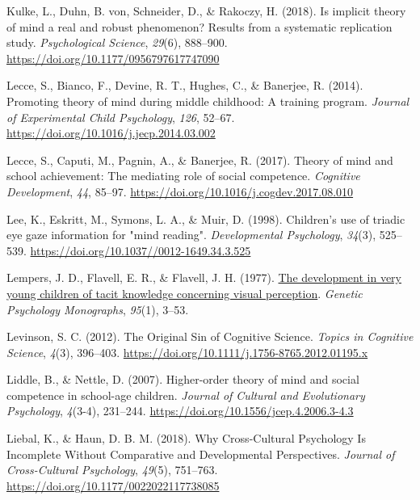\documentclass[
]{scrbook}
\newlength{\cslhangindent}
\newenvironment{CSLReferences}[2] %
 {\begin{list}{}{%
  \setlength{\itemindent}{0pt}
  \setlength{\leftmargin}{0pt}
  \setlength{\parsep}{0pt}
  \ifodd #1
   \setlength{\leftmargin}{\cslhangindent}
   \setlength{\itemindent}{-1\cslhangindent}
  \fi
  \setlength{\itemsep}{#2\baselineskip}}}
 {\end{list}}
\begin{document}
\begin{CSLReferences}{1}{0}
Kulke, L., Duhn, B. von, Schneider, D., \& Rakoczy, H. (2018). Is implicit theory of mind a real and robust phenomenon? {Results} from a systematic replication study. \emph{Psychological Science}, \emph{29}(6), 888--900. \url{https://doi.org/10.1177/0956797617747090}

Lecce, S., Bianco, F., Devine, R. T., Hughes, C., \& Banerjee, R. (2014). Promoting theory of mind during middle childhood: {A} training program. \emph{Journal of Experimental Child Psychology}, \emph{126}, 52--67. \url{https://doi.org/10.1016/j.jecp.2014.03.002}

Lecce, S., Caputi, M., Pagnin, A., \& Banerjee, R. (2017). Theory of mind and school achievement: {The} mediating role of social competence. \emph{Cognitive Development}, \emph{44}, 85--97. \url{https://doi.org/10.1016/j.cogdev.2017.08.010}

Lee, K., Eskritt, M., Symons, L. A., \& Muir, D. (1998). Children's use of triadic eye gaze information for "mind reading". \emph{Developmental Psychology}, \emph{34}(3), 525--539. \url{https://doi.org/10.1037//0012-1649.34.3.525}

Lempers, J. D., Flavell, E. R., \& Flavell, J. H. (1977). \href{https://www.ncbi.nlm.nih.gov/pubmed/849832}{The development in very young children of tacit knowledge concerning visual perception}. \emph{Genetic Psychology Monographs}, \emph{95}(1), 3--53.

Levinson, S. C. (2012). The {Original Sin} of {Cognitive Science}. \emph{Topics in Cognitive Science}, \emph{4}(3), 396--403. \url{https://doi.org/10.1111/j.1756-8765.2012.01195.x}

Liddle, B., \& Nettle, D. (2007). Higher-order theory of mind and social competence in school-age children. \emph{Journal of Cultural and Evolutionary Psychology}, \emph{4}(3-4), 231--244. \url{https://doi.org/10.1556/jcep.4.2006.3-4.3}

Liebal, K., \& Haun, D. B. M. (2018). Why {Cross-Cultural Psychology Is Incomplete Without Comparative} and {Developmental Perspectives}. \emph{Journal of Cross-Cultural Psychology}, \emph{49}(5), 751--763. \url{https://doi.org/10.1177/0022022117738085}


\end{CSLReferences}
\end{document}
